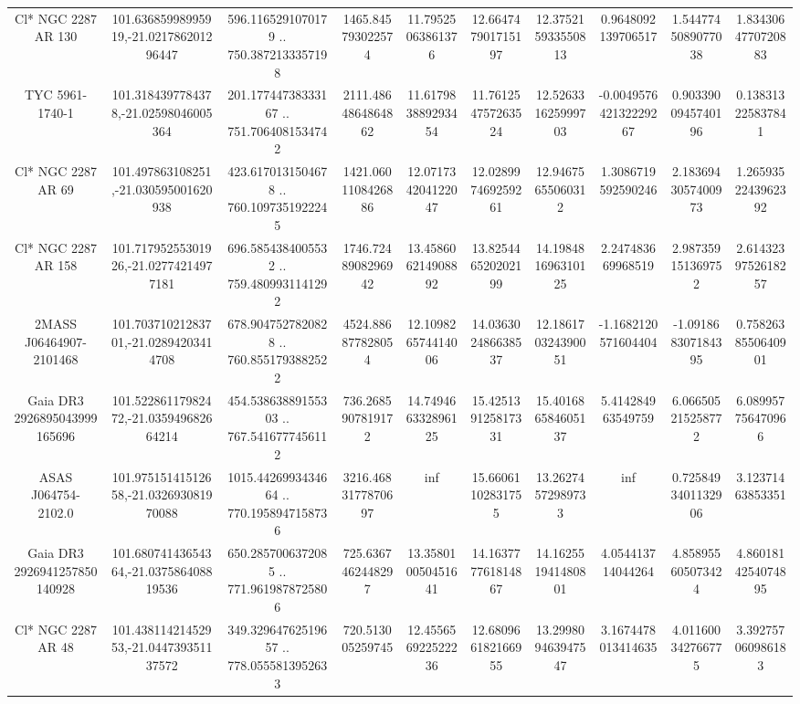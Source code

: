 \begin{table}
\begin{tabular}{cccccccccc}
Cl* NGC 2287     AR     130 & 101.63685998995919,-21.021786201296447 & 596.1165291070179 .. 750.3872133357198 & 1465.845793022574 & 11.79525063861376 & 12.664747901715197 & 12.375215933550813 & 0.9648092139706517 & 1.5447745089077038 & 1.8343064770720883 \\
TYC 5961-1740-1 & 101.3184397784378,-21.02598046005364 & 201.17744738333167 .. 751.7064081534742 & 2111.4864864864862 & 11.617983889293454 & 11.761254757263524 & 12.526331625999703 & -0.004957642132229267 & 0.9033900945740196 & 0.138313225837841 \\
Cl* NGC 2287     AR      69 & 101.497863108251,-21.030595001620938 & 423.6170131504678 .. 760.1097351922245 & 1421.0601108426886 & 12.071734204122047 & 12.028997469259261 & 12.94675655060312 & 1.3086719592590246 & 2.1836943057400973 & 1.2659352243962392 \\
Cl* NGC 2287     AR     158 & 101.71795255301926,-21.02774214977181 & 696.5854384005532 .. 759.4809931141292 & 1746.7248908296942 & 13.458606214908892 & 13.825446520202199 & 14.198481696310125 & 2.247483669968519 & 2.987359151369752 & 2.6143239752618257 \\
2MASS J06464907-2101468 & 101.70371021283701,-21.02894203414708 & 678.9047527820828 .. 760.8551793882522 & 4524.886877828054 & 12.109826574414006 & 14.036302486638537 & 12.186170324390051 & -1.1682120571604404 & -1.091868307184395 & 0.7582638550640901 \\
Gaia DR3 2926895043999165696 & 101.52286117982472,-21.035949682664214 & 454.53863889155303 .. 767.5416777456112 & 736.2685907819172 & 14.749466332896125 & 15.425139125817331 & 15.401686584605137 & 5.414284963549759 & 6.066505215258772 & 6.089957756470966 \\
ASAS J064754-2102.0 & 101.97515141512658,-21.032693081970088 & 1015.4426993434664 .. 770.1958947158736 & 3216.4683177870697 & inf & 15.66061102831755 & 13.26274572989733 & inf & 0.7258493401132906 & 3.12371463853351 \\
Gaia DR3 2926941257850140928 & 101.68074143654364,-21.037586408819536 & 650.2857006372085 .. 771.9619878725806 & 725.6367462448297 & 13.358010050451641 & 14.163777761814867 & 14.162551941480801 & 4.054413714044264 & 4.858955605073424 & 4.8601814254074895 \\
Cl* NGC 2287     AR      48 & 101.43811421452953,-21.044739351137572 & 349.32964762519657 .. 778.0555813952633 & 720.513005259745 & 12.455656922522236 & 12.680966182166955 & 13.299809463947547 & 3.1674478013414635 & 4.011600342766775 & 3.392757060986183 \\

\end{tabular}
\end{table}
